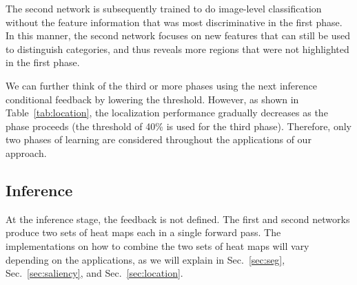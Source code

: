 \documentclass[10pt,twocolumn,letterpaper]{article}
\newcommand{\tabfref}[1]{Table~\ref{#1}}
\newcommand{\secref}[1]{Sec.~\ref{#1}}
\begin{document}
The second network is subsequently trained to do image-level classification without the feature information that was most discriminative in the first phase. In this manner, the second network focuses on new features that can still be used to distinguish categories, and thus reveals more regions that were not highlighted in the first phase.


We can further think of the third or more phases using the next inference conditional feedback by lowering the threshold. However, as shown in \tabfref{tab:location}, the localization performance gradually decreases as the phase proceeds (the threshold of 40\% is used for the third phase). Therefore, only two phases of learning are considered throughout the applications of our approach.

\subsection{Inference}
At the inference stage, the feedback is not defined. The first and second networks produce two sets of heat maps each in a single forward pass. The implementations on how to combine the two sets of heat maps will vary depending on the applications, as we will explain in \secref{sec:seg}, \secref{sec:saliency}, and \secref{sec:location}.
\end{document}
